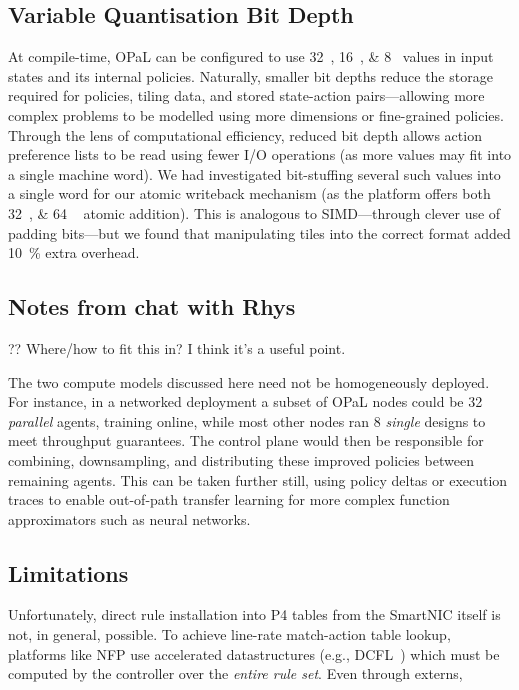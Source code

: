 \documentclass[sigconf,natbib=false]{acmart}
\newcommand{\approachshort}{OPaL}
\begin{document}
\subsection{Variable Quantisation Bit Depth}
At compile-time, \approachshort{} can be configured to use \SIlist[list-final-separator = { \translate{or} }]{32;16;8}{\bit} values in input states and its internal policies.
Naturally, smaller bit depths reduce the storage required for policies, tiling data, and stored state-action pairs---allowing more complex problems to be modelled using more dimensions or fine-grained policies.
Through the lens of computational efficiency, reduced bit depth allows action preference lists to be read using fewer I/O operations (as more values may fit into a single machine word).
We had investigated bit-stuffing several such values into a single word for our atomic writeback mechanism (as the platform offers both \SIlist{32;64
}{\bit} atomic addition).
This is analogous to SIMD---through clever use of padding bits---but we found that manipulating tiles into the correct format added \SI{10}{\percent} extra overhead.

\subsection{Notes from chat with Rhys}
?? Where/how to fit this in? I think it's a useful point.

The two compute models discussed here need not be homogeneously deployed.
For instance, in a networked deployment a subset of \approachshort{} nodes could be \SI{32}{\bit} \emph{parallel} agents, training online, while most other nodes ran \SI{8}{\bit} \emph{single} designs to meet throughput guarantees.
The control plane would then be responsible for combining, downsampling, and distributing these improved policies between remaining agents.
This can be taken further still, using policy deltas or execution traces to enable out-of-path transfer learning for more complex function approximators such as neural networks.

%
%
%

\subsection{Limitations}
Unfortunately, direct rule installation into P4 tables from the SmartNIC itself is not, in general, possible.
To achieve line-rate match-action table lookup, platforms like NFP use accelerated datastructures (e.g., DCFL~\parencite{DBLP:conf/infocom/TaylorT05}) which must be computed by the controller over the \emph{entire rule set}.
Even through externs, 
\end{document}
